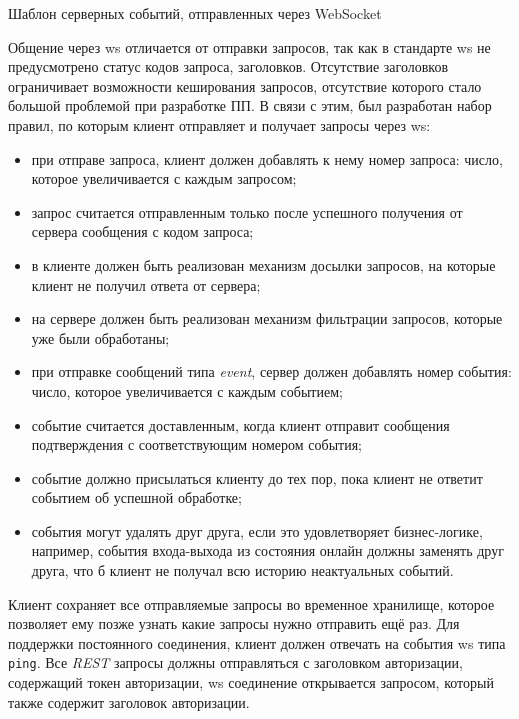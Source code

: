 \begin{code}
	\inputminted{json}{inc/src/server_ws_format.json}
   \caption{Шаблон серверных событий, отправленных через WebSocket}
   \label{sec:development:arch:pp:communication:code:ws:response}
\end{code}

Общение через \gls{ws} отличается от отправки запросов, так как в стандарте \gls{ws} не предусмотрено статус кодов запроса, заголовков. Отсутствие заголовков ограничивает возможности кеширования запросов, отсутствие которого стало большой проблемой при разработке ПП. В связи с этим, был разработан набор правил, по которым клиент отправляет и получает запросы через \gls{ws}:

\begin{itemize}
	\item при отправе запроса, клиент должен добавлять к нему номер запроса: число, которое увеличивается с каждым запросом;
	\item запрос считается отправленным только после успешного получения от сервера сообщения с кодом запроса;
	\item в клиенте должен быть реализован механизм досылки запросов, на которые клиент не получил ответа от сервера;
	\item на сервере должен быть реализован механизм фильтрации запросов, которые уже были обработаны;
	\item при отправке сообщений типа \textit{event}, сервер должен добавлять номер события: число, которое увеличивается с каждым событием;
	\item событие считается доставленным, когда клиент отправит сообщения подтверждения с соответствующим номером события;
	\item событие должно присылаться клиенту до тех пор, пока клиент не ответит событием об успешной обработке;
	\item события могут удалять друг друга, если это удовлетворяет бизнес-логике, например, события входа-выхода из состояния онлайн должны заменять друг друга, что б клиент не получал всю историю неактуальных событий.
\end{itemize}

Клиент сохраняет все отправляемые запросы во временное хранилище, которое позволяет ему позже узнать какие запросы нужно отправить ещё раз. Для поддержки постоянного соединения, клиент должен отвечать на события \gls{ws} типа \texttt{ping}. Все \textit{REST} запросы должны отправляться с заголовком авторизации, содержащий токен авторизации, \gls{ws} соединение открывается запросом, который также содержит заголовок авторизации.